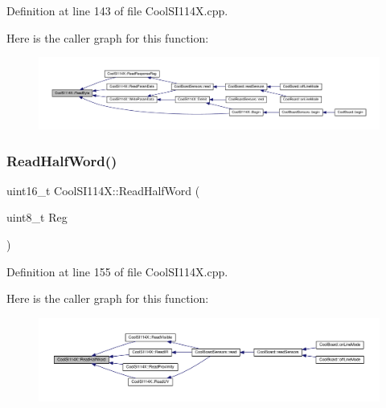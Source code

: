 Definition at line 143 of file Cool\+S\+I114\+X.\+cpp.

Here is the caller graph for this function\+:\nopagebreak
\begin{figure}[H]
\begin{center}
\leavevmode
\includegraphics[width=350pt]{class_cool_s_i114_x_acc20f8037e156ec4aadcbe90780b1e8b_icgraph}
\end{center}
\end{figure}
\mbox{\label{class_cool_s_i114_x_a1d25c9e137874af529804c2ec796a6b9}} 
\subsubsection{\texorpdfstring{Read\+Half\+Word()}{ReadHalfWord()}}
{\footnotesize\ttfamily uint16\+\_\+t Cool\+S\+I114\+X\+::\+Read\+Half\+Word (\begin{DoxyParamCaption}\item[{uint8\+\_\+t}]{Reg }\end{DoxyParamCaption})\hspace{0.3cm}{\ttfamily [private]}}



Definition at line 155 of file Cool\+S\+I114\+X.\+cpp.

Here is the caller graph for this function\+:\nopagebreak
\begin{figure}[H]
\begin{center}
\leavevmode
\includegraphics[width=350pt]{class_cool_s_i114_x_a1d25c9e137874af529804c2ec796a6b9_icgraph}
\end{center}
\end{figure}
\mbox{\label{class_cool_s_i114_x_abc536ee7ae8e3ba9d1069acc3889a2cf}} 
